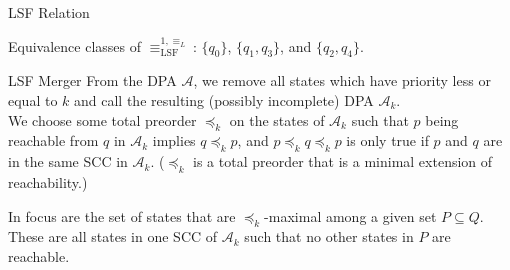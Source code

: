 \begin{frame}{LSF Relation}
\begin{figure}
\centering
{}
\end{figure}

Equivalence classes of $\equiv_\text{LSF}^{1,\equiv_L}$: $\{q_0\}$, $\{q_1, q_3\}$, and $\{q_2, q_4\}$.
\end{frame}


\begin{frame}{LSF Merger}
From the DPA $\mathcal{A}$, we remove all states which have priority less or equal to $k$ and call the resulting (possibly incomplete) DPA $\mathcal{A}_k$. \\
We choose some total preorder $\preceq_k$ on the states of $\mathcal{A}_k$ such that $p$ being reachable from $q$ in $\mathcal{A}_k$ implies $q \preceq_k p$, and $p \preceq_k q \preceq_k p$ is only true if $p$ and $q$ are in the same SCC in $\mathcal{A}_k$. ($\preceq_k$ is a total preorder that is a minimal extension of reachability.)

\vspace{1cm}

In focus are the set of states that are $\preceq_k$-maximal among a given set $P \subseteq Q$. These are all states in one SCC of $\mathcal{A}_k$ such that no other states in $P$ are reachable.
\end{frame}


